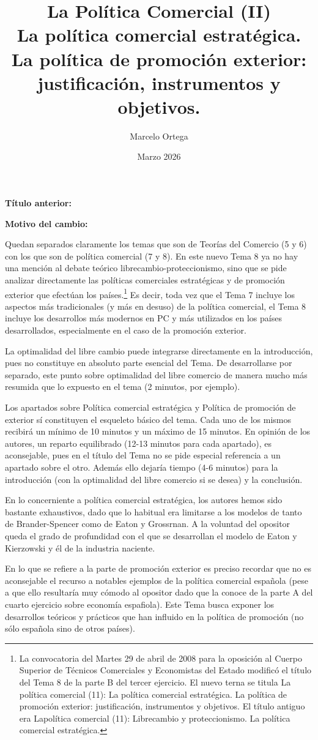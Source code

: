 \documentclass[10pt,a4paper]{article}
\title{La Política Comercial (II)\\
\large La política comercial estratégica. La política de promoción exterior: justificación, instrumentos y objetivos.}
\author{Marcelo Ortega}
\date{Marzo 2026}
\newcommand{\puntosclave}[1]{%
  \begin{tcolorbox}[
    colframe=black,
    title={Puntos clave},
    before upper={\setlength{\parindent}{0.5cm}\setlength{\parskip}{0.5\baselineskip}}
  ]
  #1
  \end{tcolorbox}
}
\newcommand{\changebox}{%
\begin{tcolorbox}[title={Historial de cambios del tema}]
\textbf{Título anterior:} \OldTitle\par
\textbf{Motivo del cambio:} \ChangeWhy
\end{tcolorbox}
}
\begin{document}
\maketitle
\changebox

\newpage

\puntosclave{ %
     Quedan separados claramente los temas que son de Teorías del Comercio (5 y 6) con los que son de política comercial (7 y 8). En este nuevo Tema 8 ya no hay una mención al debate teórico librecambio-proteccionismo, sino que se pide analizar directamente las políticas comerciales estratégicas y de promoción exterior que efectúan los países.\footnote{%
         La convocatoria del Martes 29 de abril de 2008 para la oposición al Cuerpo Superior de Técnicos Comerciales y Economistas del Estado modificó el título del Tema 8 de la parte B del tercer ejercicio. El nuevo terna se titula La política comercial (11): La política comercial estratégica. La política de promoción exterior: justificación, instrumentos y objetivos. El título antiguo era Lapolítica comercial (11): Librecambio y proteccionismo. La política comercial estratégica.
     } Es decir, toda vez que el Tema 7 incluye los aspectos más tradicionales (y más en desuso) de la política comercial, el Tema 8 incluye los desarrollos más modernos en PC y más utilizados en los países desarrollados, especialmente en el caso de la promoción exterior. 
     
     La optimalidad del libre cambio puede integrarse directamente en la introducción, pues no constituye en absoluto parte esencial del Tema. De desarrollarse por separado, este punto sobre optimalidad del libre comercio de manera mucho más resumida que lo expuesto en el tema (2 minutos, por ejemplo).

     Los apartados sobre Política comercial estratégica y Política de promoción de exterior sí constituyen el esqueleto básico del tema. Cada uno de los mismos recibirá un mínimo de 10 minutos y un máximo de 15 minutos. En opinión de los autores, un reparto equilibrado (12-13 minutos para cada apartado), es aconsejable, pues en el título del Tema no se pide especial referencia a un apartado sobre el otro. Además ello dejaría tiempo (4-6 minutos) para la introducción (con la optimalidad del libre comercio si se desea) y la conclusión.

     En lo concerniente a política comercial estratégica, los autores hemos sido bastante exhaustivos, dado que lo habitual era limitarse a los modelos de tanto de Brander-Spencer como de Eaton y Grossrnan. A la voluntad del opositor queda el grado de profundidad con el que se desarrollan el modelo de Eaton y Kierzowski y él de la industria naciente.

     En lo que se refiere a la parte de promoción exterior es preciso recordar que no es aconsejable el recurso a notables ejemplos de la política comercial española (pese a que ello resultaría muy cómodo al opositor dado que la conoce de la parte A del cuarto ejercicio sobre economía espafiola). Este Tema busca exponer los desarrollos teóricos y prácticos que han influido en la política de promoción (no sólo española sino de otros países).
    }
    
\end{document}

